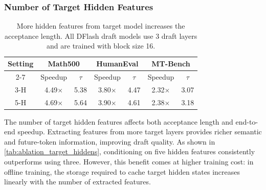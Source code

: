 \subsubsection{Number of Target Hidden Features}
\begin{table}[h]
\centering
\renewcommand{\arraystretch}{0.9}
\caption{More hidden features from target model increases the acceptance length. All DFlash draft models use 3 draft layers and are trained with block size 16.}
\label{tab:ablation_target_hiddens}
\small
\setlength{\tabcolsep}{3pt}
\begin{tabular}{ccccccc}
\toprule
\multirow{2}[2]{*}{Setting}
& \multicolumn{2}{c}{Math500} 
& \multicolumn{2}{c}{HumanEval} 
& \multicolumn{2}{c}{MT-Bench} \\
\cmidrule{2-7}
& Speedup & $\tau$ 
& Speedup & $\tau$
& Speedup & $\tau$\\
\midrule
3-H & 4.49$\times$ & 5.38 & 3.80$\times$ & 4.47 & 2.32$\times$ & 3.07 \\
5-H & 4.69$\times$ & 5.64 & 3.90$\times$ & 4.61 & 2.38$\times$ & 3.18 \\
\bottomrule
\end{tabular}
\end{table}
The number of target hidden features affects both acceptance length and end-to-end speedup. Extracting features from more target layers provides richer semantic and future-token information, improving draft quality. As shown in \autoref{tab:ablation_target_hiddens}, conditioning on five hidden features consistently outperforms using three. However, this benefit comes at higher training cost: in offline training, the storage required to cache target hidden states increases linearly with the number of extracted features.


